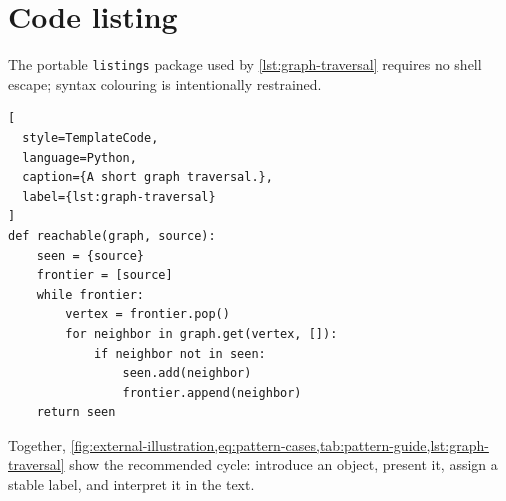 
\clearpage
\section{Code listing}

The portable \texttt{listings} package used by \cref{lst:graph-traversal}
requires no shell escape; syntax colouring is intentionally restrained.

% 
\begin{lstlisting}[
  style=TemplateCode,
  language=Python,
  caption={A short graph traversal.},
  label={lst:graph-traversal}
]
def reachable(graph, source):
    seen = {source}
    frontier = [source]
    while frontier:
        vertex = frontier.pop()
        for neighbor in graph.get(vertex, []):
            if neighbor not in seen:
                seen.add(neighbor)
                frontier.append(neighbor)
    return seen
\end{lstlisting}

Together, \cref{fig:external-illustration,eq:pattern-cases,tab:pattern-guide,lst:graph-traversal}
show the recommended cycle: introduce an object, present it, assign a stable
label, and interpret it in the text.
